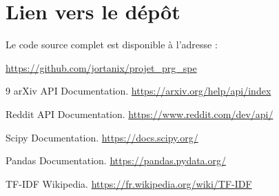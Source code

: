 \documentclass[12pt,a4paper]{article}
\begin{document}
\section*{Lien vers le dépôt}

Le code source complet est disponible à l'adresse :
\begin{center}
\url{https://github.com/jortanix/projet_prg_spe}
\end{center}

\begin{thebibliography}{9}
arXiv API Documentation. \url{https://arxiv.org/help/api/index}

Reddit API Documentation. \url{https://www.reddit.com/dev/api/}

Scipy Documentation. \url{https://docs.scipy.org/}

Pandas Documentation. \url{https://pandas.pydata.org/}

TF-IDF Wikipedia. \url{https://fr.wikipedia.org/wiki/TF-IDF}

\end{thebibliography}
\end{document}
